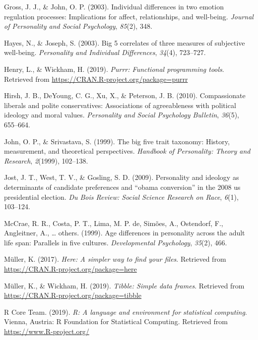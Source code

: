 \documentclass[man]{apa6}
\begin{document}
\hypertarget{ref-gross2003individual}{}
Gross, J. J., \& John, O. P. (2003). Individual differences in two
emotion regulation processes: Implications for affect, relationships,
and well-being. \emph{Journal of Personality and Social Psychology},
\emph{85}(2), 348.

\hypertarget{ref-hayes2003big}{}
Hayes, N., \& Joseph, S. (2003). Big 5 correlates of three measures of
subjective well-being. \emph{Personality and Individual Differences},
\emph{34}(4), 723--727.

\hypertarget{ref-R-purrr}{}
Henry, L., \& Wickham, H. (2019). \emph{Purrr: Functional programming
tools}. Retrieved from \url{https://CRAN.R-project.org/package=purrr}

\hypertarget{ref-hirsh2010compassionate}{}
Hirsh, J. B., DeYoung, C. G., Xu, X., \& Peterson, J. B. (2010).
Compassionate liberals and polite conservatives: Associations of
agreeableness with political ideology and moral values.
\emph{Personality and Social Psychology Bulletin}, \emph{36}(5),
655--664.

\hypertarget{ref-john1999big}{}
John, O. P., \& Srivastava, S. (1999). The big five trait taxonomy:
History, measurement, and theoretical perspectives. \emph{Handbook of
Personality: Theory and Research}, \emph{2}(1999), 102--138.

\hypertarget{ref-jost2009personality}{}
Jost, J. T., West, T. V., \& Gosling, S. D. (2009). Personality and
ideology as determinants of candidate preferences and ``obama
conversion'' in the 2008 us presidential election. \emph{Du Bois Review:
Social Science Research on Race}, \emph{6}(1), 103--124.

\hypertarget{ref-mccrae1999age}{}
McCrae, R. R., Costa, P. T., Lima, M. P. de, Simões, A., Ostendorf, F.,
Angleitner, A., \ldots{} others. (1999). Age differences in personality
across the adult life span: Parallels in five cultures.
\emph{Developmental Psychology}, \emph{35}(2), 466.

\hypertarget{ref-R-here}{}
Müller, K. (2017). \emph{Here: A simpler way to find your files}.
Retrieved from \url{https://CRAN.R-project.org/package=here}

\hypertarget{ref-R-tibble}{}
Müller, K., \& Wickham, H. (2019). \emph{Tibble: Simple data frames}.
Retrieved from \url{https://CRAN.R-project.org/package=tibble}

\hypertarget{ref-R-base}{}
R Core Team. (2019). \emph{R: A language and environment for statistical
computing}. Vienna, Austria: R Foundation for Statistical Computing.
Retrieved from \url{https://www.R-project.org/}
\end{document}
